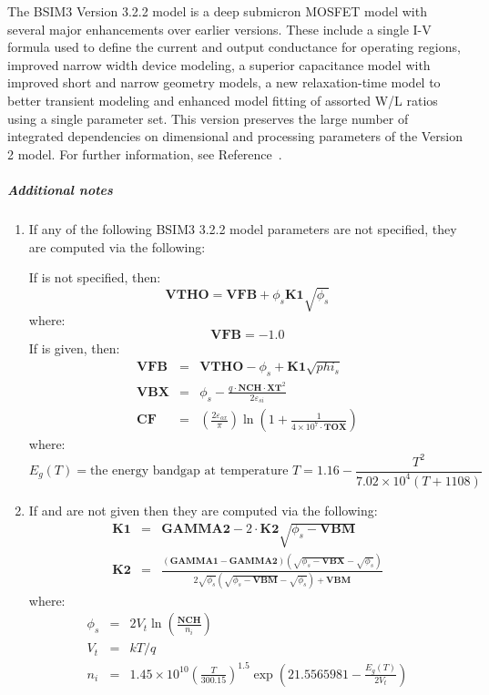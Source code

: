 The BSIM3 Version 3.2.2 model is a deep submicron MOSFET model with several major
enhancements over earlier versions.  These include a single I-V formula used
to define the current and output conductance for operating regions, improved
narrow width device modeling, a superior capacitance model with improved short
and narrow geometry models, a new relaxation-time model to better transient
modeling and enhanced model fitting of assorted W/L ratios using a single
parameter set.  This version preserves the large number of integrated
dependencies on dimensional and processing parameters of the Version 2 model.
For further information, see Reference~\cite{HLJHCKH}.

\subparagraph{Additional notes}
\begin{enumerate}
\item If any of the following BSIM3 3.2.2 model parameters are not specified,
they are computed via the following:

If  is not specified, then:
\[
\mathbf{VTHO} = \mathbf{VFB} + \phi_s \mathbf{K1} \sqrt{\phi_s}
\]
where:
\[
\mathbf{VFB} = -1.0
\]
If  is given, then:
\begin{eqnarray*}
\mathbf{VFB} & = & \mathbf{VTHO} - \phi_s + \mathbf{K1}\sqrt{phi_s} \\
\mathbf{VBX} & = & \phi_s - \frac{q\cdot\mathbf{NCH} \cdot
\mathbf{XT}^2}{2\varepsilon_{si}} \\
\mathbf{CF} & = & \left( \frac{2\varepsilon_{ox}}{\pi} \right)
\ln \left(1 + \frac{1}{4 \times 10^7\cdot\mathbf{TOX}} \right)
\end{eqnarray*}
where:
\[
E_g(T) = \mbox{the energy bandgap at temperature }T = 1.16 - \frac{T^2}{7.02
\times 10^4(T + 1108)}
\]

\item If  and  are not given then they are computed via
the following:
\begin{eqnarray*}
\mathbf{K1} &=& \mathbf{GAMMA2} - 2 \cdot \mathbf{K2} \sqrt{\phi_s -
\mathbf{VBM}} \\
\mathbf{K2} &=& \frac{(\mathbf{GAMMA1} -
\mathbf{GAMMA2})(\sqrt{\phi_s - \mathbf{VBX}} -
\sqrt{\phi_s})}{2\sqrt{\phi_s}(\sqrt{\phi_s - \mathbf{VBM}} -
\sqrt{\phi_s}) + \mathbf{VBM}}
\end{eqnarray*}
where:
\begin{eqnarray*}
\phi_s & = & 2V_t \ln \left(\frac{\mathbf{NCH}}{n_i} \right) \\
V_t    & = & kT / q \\
n_i    & = & 1.45 \times 10^{10} \left(\frac{T}{300.15}
\right)^{1.5} \exp \left(21.5565981 - \frac{E_g(T)}{2V_t} \right)
\end{eqnarray*}


\end{enumerate}
